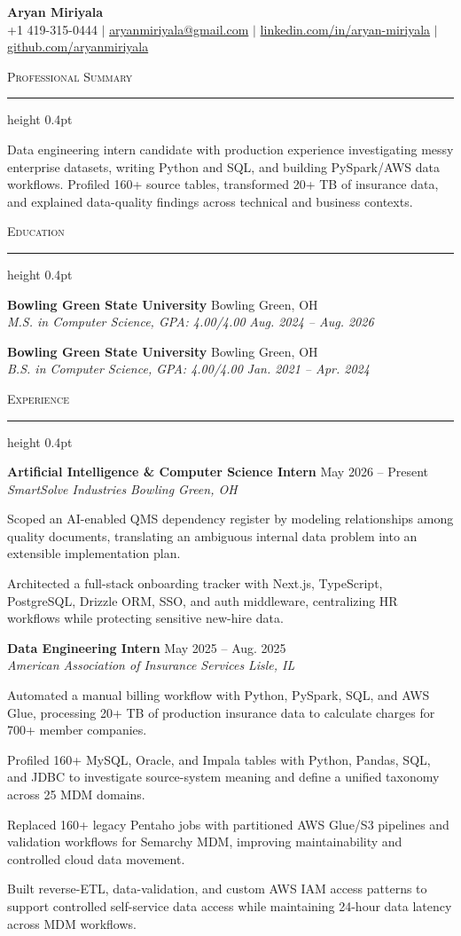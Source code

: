 \documentclass[letterpaper,11pt]{article}
\newcommand{\resumesection}[1]{%
  \par\vspace{2pt}%
  {\large\scshape #1}\par\vspace{2pt}%
  \hrule height 0.4pt\vspace{2pt}%
}
\newcommand{\resumeSubheading}[4]{
  \textbf{#1} \hfill #2\\
  \textit{#3} \hfill \textit{#4}
}
\begin{document}
\begin{center}
  {\LARGE \textbf{Aryan Miriyala}}\\[-1pt]
  \small
  +1 419-315-0444 $|$
  \href{mailto:aryanmiriyala@gmail.com}{aryanmiriyala@gmail.com} $|$
  \href{https://www.linkedin.com/in/aryan-miriyala-7788a21b6/}{linkedin.com/in/aryan-miriyala} $|$
  \href{https://github.com/aryanmiriyala}{github.com/aryanmiriyala}
\end{center}\vspace{-10pt}

\resumesection{Professional Summary}
Data engineering intern candidate with production experience investigating messy enterprise datasets, writing Python and SQL, and building PySpark/AWS data workflows. Profiled 160+ source tables, transformed 20+ TB of insurance data, and explained data-quality findings across technical and business contexts.

\resumesection{Education}
\resumeSubheading
{Bowling Green State University}{Bowling Green, OH}
{M.S. in Computer Science, GPA: 4.00/4.00}{Aug. 2024 -- Aug. 2026}

\resumeSubheading
{Bowling Green State University}{Bowling Green, OH}
{B.S. in Computer Science, GPA: 4.00/4.00}{Jan. 2021 -- Apr. 2024}

\resumesection{Experience}
\resumeSubheading
{Artificial Intelligence \& Computer Science Intern}{May 2026 -- Present}
{SmartSolve Industries}{Bowling Green, OH}
\begin{tightitemize}
  \item Scoped an AI-enabled QMS dependency register by modeling relationships among quality documents, translating an ambiguous internal data problem into an extensible implementation plan.
  \item Architected a full-stack onboarding tracker with Next.js, TypeScript, PostgreSQL, Drizzle ORM, SSO, and auth middleware, centralizing HR workflows while protecting sensitive new-hire data.
\end{tightitemize}

\resumeSubheading
{Data Engineering Intern}{May 2025 -- Aug. 2025}
{American Association of Insurance Services}{Lisle, IL}
\begin{tightitemize}
  \item Automated a manual billing workflow with Python, PySpark, SQL, and AWS Glue, processing 20+ TB of production insurance data to calculate charges for 700+ member companies.
  \item Profiled 160+ MySQL, Oracle, and Impala tables with Python, Pandas, SQL, and JDBC to investigate source-system meaning and define a unified taxonomy across 25 MDM domains.
  \item Replaced 160+ legacy Pentaho jobs with partitioned AWS Glue/S3 pipelines and validation workflows for Semarchy MDM, improving maintainability and controlled cloud data movement.
  \item Built reverse-ETL, data-validation, and custom AWS IAM access patterns to support controlled self-service data access while maintaining 24-hour data latency across MDM workflows.
\end{tightitemize}
\end{document}
